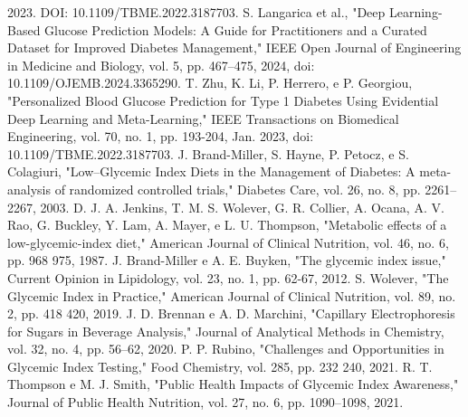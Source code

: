 \documentclass[conference]{IEEEtran}
\begin{document}
\begin{thebibliography}{00}
2023. DOI: 10.1109/TBME.2022.3187703.
 S. Langarica et al., "Deep Learning-Based Glucose Prediction Models: A Guide for Practitioners and a Curated
Dataset for Improved Diabetes Management," IEEE Open Journal of Engineering in Medicine and Biology, vol. 5, pp. 467–475,
2024, doi: 10.1109/OJEMB.2024.3365290.
 T. Zhu, K. Li, P. Herrero, e P. Georgiou, "Personalized Blood Glucose Prediction for Type 1 Diabetes Using
Evidential Deep Learning and Meta-Learning," IEEE Transactions on Biomedical Engineering, vol. 70, no. 1, pp. 193-204, Jan.
2023, doi: 10.1109/TBME.2022.3187703.
 J. Brand-Miller, S. Hayne, P. Petocz, e S. Colagiuri, "Low–Glycemic Index Diets in the Management of
Diabetes: A meta-analysis of randomized controlled trials," Diabetes Care, vol. 26, no. 8, pp. 2261–2267, 2003.
 D. J. A. Jenkins, T. M. S. Wolever, G. R. Collier, A. Ocana, A. V. Rao, G. Buckley, Y. Lam, A. Mayer, e L. U.
Thompson, "Metabolic effects of a low-glycemic-index diet," American Journal of Clinical Nutrition, vol. 46, no. 6, pp. 968
975, 1987.
 J. Brand-Miller e A. E. Buyken, "The glycemic index issue," Current Opinion in Lipidology, vol. 23, no. 1,
pp. 62-67, 2012.
 S. Wolever, "The Glycemic Index in Practice," American Journal of Clinical Nutrition, vol. 89, no. 2, pp. 418
420, 2019.
 J. D. Brennan e A. D. Marchini, "Capillary Electrophoresis for Sugars in Beverage Analysis," Journal of
Analytical Methods in Chemistry, vol. 32, no. 4, pp. 56–62, 2020.
 P. P. Rubino, "Challenges and Opportunities in Glycemic Index Testing," Food Chemistry, vol. 285, pp. 232
240, 2021.
 R. T. Thompson e M. J. Smith, "Public Health Impacts of Glycemic Index Awareness," Journal of Public Health
Nutrition, vol. 27, no. 6, pp. 1090–1098, 2021.
\end{thebibliography}
\end{document}
